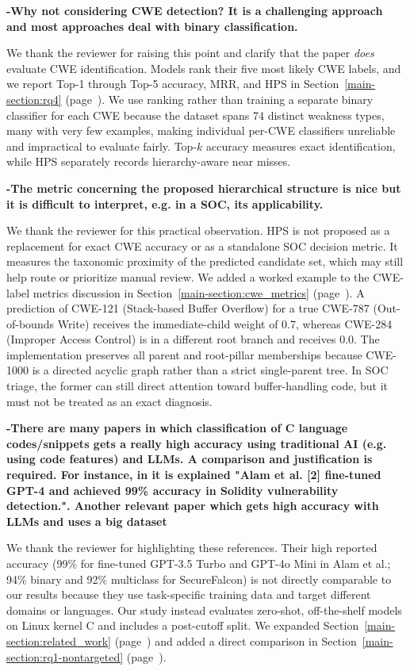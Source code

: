 \documentclass[journal,onecolumn]{IEEEtran}
\begin{document}
\textbf{-Why not considering CWE detection? It is a challenging approach and most approaches deal with binary classification.}

We thank the reviewer for raising this point and clarify that the paper \emph{does} evaluate CWE identification. Models rank their five most likely CWE labels, and we report Top-1 through Top-5 accuracy, MRR, and HPS in Section~\ref{main-section:rq4} (page~\pageref{main-section:rq4}). We use ranking rather than training a separate binary classifier for each CWE because the dataset spans 74 distinct weakness types, many with very few examples, making individual per-CWE classifiers unreliable and impractical to evaluate fairly. Top-$k$ accuracy measures exact identification, while HPS separately records hierarchy-aware near misses.
 
\textbf{-The metric concerning the proposed hierarchical structure is nice but it is difficult to interpret, e.g. in a SOC, its applicability.}

We thank the reviewer for this practical observation. HPS is not proposed as a replacement for exact CWE accuracy or as a standalone SOC decision metric. It measures the taxonomic proximity of the predicted candidate set, which may still help route or prioritize manual review. We added a worked example to the CWE-label metrics discussion in Section~\ref{main-section:cwe_metrics} (page~\pageref{main-section:cwe_metrics}). A prediction of CWE-121 (Stack-based Buffer Overflow) for a true CWE-787 (Out-of-bounds Write) receives the immediate-child weight of 0.7, whereas CWE-284 (Improper Access Control) is in a different root branch and receives 0.0. The implementation preserves all parent and root-pillar memberships because CWE-1000 is a directed acyclic graph rather than a strict single-parent tree. In SOC triage, the former can still direct attention toward buffer-handling code, but it must not be treated as an exact diagnosis.

\textbf{-There are many papers in which classification of C language codes/snippets gets a really high accuracy using traditional AI (e.g. using code features) and LLMs. A comparison and justification is required. For instance, in \cite{sheng2025llms} it is explained "Alam et al. [2] fine-tuned GPT-4 and achieved 99\% accuracy in Solidity vulnerability detection.". Another relevant paper which gets high accuracy with LLMs and uses a big dataset \cite{ferrag2025securefalcon}}

We thank the reviewer for highlighting these references. Their high reported accuracy (99\% for fine-tuned GPT-3.5 Turbo and GPT-4o Mini in Alam et al.; 94\% binary and 92\% multiclass for SecureFalcon) is not directly comparable to our results because they use task-specific training data and target different domains or languages. Our study instead evaluates zero-shot, off-the-shelf models on Linux kernel C and includes a post-cutoff split. We expanded Section~\ref{main-section:related_work} (page~\pageref{main-section:related_work}) and added a direct comparison in Section~\ref{main-section:rq1-nontargeted} (page~\pageref{main-section:rq1-nontargeted}).
\end{document}
